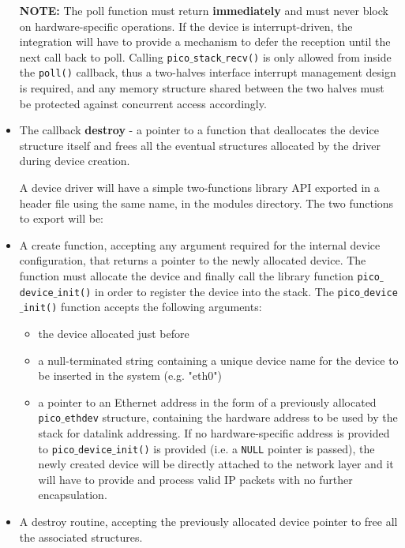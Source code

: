 \begin{itemize}
\textbf{NOTE:} The poll function must return \textbf{immediately} and must never block on
hardware-specific operations. If the device is interrupt-driven, the integration will have
to provide a mechanism to defer the reception until the next call back to poll. Calling
\texttt{pico$\_$stack$\_$recv()} is only allowed from inside the \texttt{poll()} callback,
thus a two-halves interface interrupt management design is required, and any memory structure
shared between the two halves must be protected against concurrent access accordingly.

\item The callback \textbf{destroy} - a pointer to a function that deallocates the device
structure itself and frees all the eventual structures allocated by the driver during device
creation.

A device driver will have a simple two-functions library API exported in a header file using
the same name, in the modules directory. The two functions to export will be:

\item A create function, accepting any argument required for the internal device configuration,
that returns a pointer to the newly allocated device. The function must allocate the device and
finally call the library function \texttt{pico$\_$device$\_$init()} in order to register the
device into the stack.
The \texttt{pico$\_$device$\_$init()} function accepts the following arguments:

\begin{itemize}
\item the device allocated just before
\item a null-terminated string containing a unique device name for the device to be inserted in
the system (e.g. "eth0")
\item a pointer to an Ethernet address in the form of a previously allocated \texttt{pico$\_$ethdev}
structure, containing the hardware address to be used by the stack for datalink addressing.
If no hardware-specific address is provided to \texttt{pico$\_$device$\_$init()} is provided
(i.e. a \texttt{NULL} pointer is passed), the newly created device will be directly attached
to the network layer and it will have to provide and process valid IP packets with no further
encapsulation.
\end{itemize}

\item A destroy routine, accepting the previously allocated device pointer to free all the associated structures.

\end{itemize}

